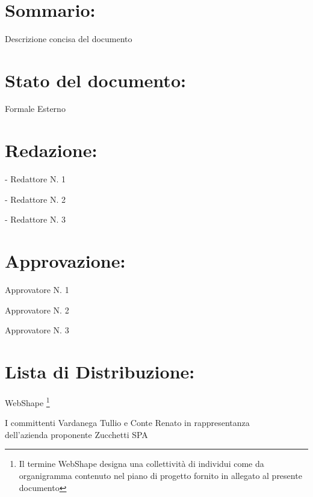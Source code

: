 \newpage

\begin{center} %
	\begin{Huge}	
				\textbf{\TITOLODOC}
			\\
	\end{Huge}
\end{center}

\section*{\Large Sommario:} %
\indent \indent
Descrizione concisa del documento

\section*{\Large Stato del documento:}
\indent \indent
	Formale Esterno

\section*{\Large Redazione:}
	\begin{elencopuntato}[\normindent]
		\item[-] Redattore N. 1
		\item[-] Redattore N. 2
		\item[-] Redattore N. 3
	\end{elencopuntato}

\section*{\Large Approvazione:}
	\begin{elencopuntato}[\normindent]
		\item Approvatore N. 1
		\item Approvatore N. 2
		\item Approvatore N. 3
	\end{elencopuntato}

\section*{\LARGE Lista di Distribuzione:}

	\begin{elenconumerato}{\normindent}
		\item WebShape \footnote{Il termine WebShape designa una collettivit\`a di individui come da organigramma contenuto nel piano di progetto fornito in allegato al presente documento}
		\item I committenti Vardanega Tullio e Conte Renato in rappresentanza \\  dell'azienda proponente Zucchetti SPA
	\end{elenconumerato}

